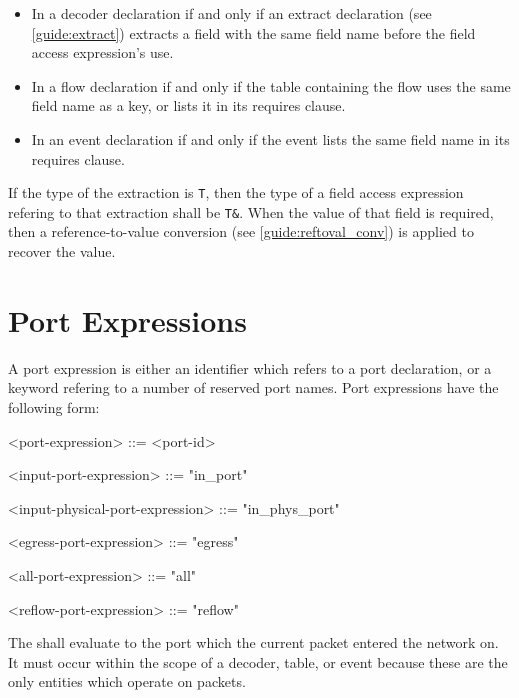 \begin{itemize}
\item In a decoder declaration if and only if an extract declaration (see \ref{guide:extract}) extracts a field with the same field name before the field access expression's use.

\item In a flow declaration if and only if the table containing the flow uses the same field name as a key, or lists it in its requires clause.

\item In an event declaration if and only if the event lists the same field name in its requires clause.
\end{itemize}

If the type of the extraction is \texttt{T}, then the type of a field access expression refering to that extraction shall be \texttt{T\&}. When the value of that field is required, then a reference-to-value conversion (see \ref{guide:reftoval_conv}) is applied to recover the value.

\section{Port Expressions} \label{guide:port_expr}

A port expression is either an identifier which refers to a port declaration, or a keyword refering to a number of reserved port names. Port expressions have the following form:

\begin{minip}
\begin{grammar}
<port-expression> ::= <port-id>

<input-port-expression> ::= "in_port"

<input-physical-port-expression> ::= "in_phys_port"

<egress-port-expression> ::= "egress"

<all-port-expression> ::= "all"

<reflow-port-expression> ::= "reflow"
\end{grammar}
\end{minip} 

The  shall evaluate to the port which the current packet entered the network on. It must occur within the scope of a decoder, table, or event because these are the only entities which operate on packets.

